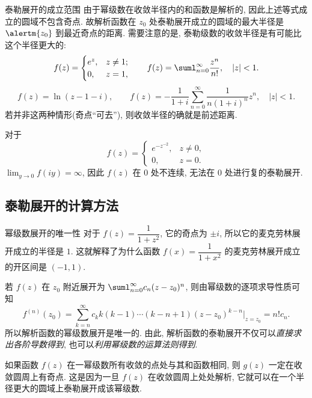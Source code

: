 \begin{frame}{泰勒展开的成立范围}
	\onslide<+->
	由于幂级数在收敛半径内的和函数是解析的, 因此上述等式成立的圆域不包含奇点.
	\onslide<+->
	故解析函数在 $z_0$ 处\alert{泰勒展开成立的圆域的最大半径是 $\alertm{z_0}$ 到最近奇点的距离}.
	\onslide<+->
	需要注意的是, 泰勒级数的收敛半径是有可能比这个半径更大的:
	\[f(z)=\begin{cases}
	e^z,&z\neq 1;\\ 0,&z=1,
	\end{cases}\qquad f(z)=\suml_{n=0}^\infty \dfrac{z^n}{n!},\quad |z|<1.\]
	\onslide<+->
	\[f(z)=\ln(z-1-i),\qquad f(z)=-\frac1{1+i}\sum_{n=0}^\infty\frac1{n(1+i)^n}z^n,\quad |z|<1.\]
	\onslide<+->
	若并非这两种情形(奇点``可去''), 则收敛半径的确就是前述距离.

	\onslide<+->
	对于
	\[f(z)=\begin{cases}
	e^{-z^{-2}},&z\neq 0,\\
	0,&z=0.\end{cases}\]
	\onslide<+->
	$\lim_{y\to 0}f(iy)=\infty$, 因此 $f(z)$ 在 $0$ 处不连续, 无法在 $0$ 处进行复的泰勒展开.
\end{frame}


\subsection{泰勒展开的计算方法}
\begin{frame}{幂级数展开的唯一性}
	\onslide<+->
	对于 $f(z)=\dfrac1{1+z^2}$,
	\onslide<+->
	它的奇点为 $\pm i$, 所以它的麦克劳林展开成立的半径是 $1$.
	\onslide<+->
	这就解释了为什么函数 $f(x)=\dfrac1{1+x^2}$ 的麦克劳林展开成立的开区间是 $(-1,1)$.

	\onslide<+->
	若 $f(z)$ 在 $z_0$ 附近展开为 $\suml_{n=0}^\infty c_n(z-z_0)^n$,
	\onslide<+->
	则由幂级数的逐项求导性质可知
	\[f^{(n)}(z_0)=\sum_{k=n}^\infty c_k k(k-1)\cdots(k-n+1)(z-z_0)^{k-n}\Big|_{z=z_0}=n!c_n.\]
	\onslide<+->
	所以\alert{解析函数的幂级数展开是唯一的}.
	\onslide<+->
	由此, 解析函数的泰勒展开不仅可以\emph{直接求出各阶导数得到}, 也可以\emph{利用幂级数的运算法则得到}.

	\onslide<+->
	如果函数 $f(z)$ 在一幂级数所有收敛的点处与其和函数相同, 则 $g(z)$ \alert{一定在收敛圆周上有奇点}.
	\onslide<+->
	这是因为一旦 $f(z)$ 在收敛圆周上处处解析, 它就可以在一个半径更大的圆域上泰勒展开成该幂级数.
\end{frame}


